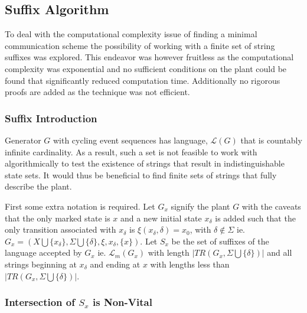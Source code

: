 \documentclass{article}
\begin{document}
		\subsection{Suffix Algorithm}

			To deal with the computational complexity issue of finding a minimal communication scheme the possibility of working with a finite set of string suffixes was explored. This endeavor was however fruitless as the computational complexity was exponential and no sufficient conditions on the plant could be found that significantly reduced computation time. Additionally no rigorous proofs are added as the technique was not efficient.

			\subsubsection{Suffix Introduction}

				Generator $G$ with cycling event sequences has language, $\mathcal{L}(G)$ that is countably infinite cardinality. As a result, such a set is not feasible to work with algorithmically to test the existence of strings that result in indistinguishable state sets. It would thus be beneficial to find finite sets of strings that fully describe the plant.

				First some extra notation is required. Let $G_x$ signify the plant $G$ with the caveats that the only marked state is $x$ and a new initial state $x_\delta$ is added such that the only transition associated with $x_\delta$ is $\xi(x_\delta,\delta) = x_0$, with $\delta \notin \Sigma$ ie. $G_x = (X \bigcup \{x_\delta\}, \Sigma \bigcup \{\delta\}, \xi, x_\delta, \{x\})$. Let $S_x$ be the set of suffixes of the language accepted by $G_x$ ie. $\mathcal{L}_m(G_x)$ with length $|TR(G_x, \Sigma \bigcup \{\delta\})|$ and all strings beginning at $x_\delta$ and ending at $x$ with lengths less than $|TR(G_x,\Sigma \bigcup \{\delta\})|$.

			\subsubsection{Intersection of $S_x$ is Non-Vital}
\end{document}

